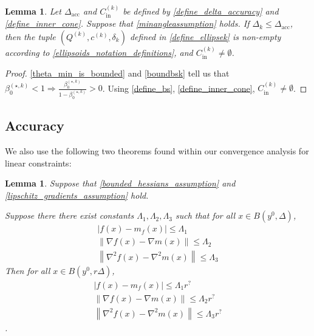\documentclass{article}
\newtheorem{lemma}[theorem]{Lemma}
\theoremstyle{case}
\numberwithin{theorem}{subsection}
\newcommand{\bsk}{{\beta_0^{(\star, k)}}}
\newcommand{\ck}{{c^{(k)}}}
\newcommand{\dacc}{{\Delta_{\textrm{acc}}}}
\newcommand{\dk}{\Delta_k}
\newcommand{\fcki}{{C^{(k)}_{\textrm{in}}}}
\newcommand{\gradf}{\nabla f}
\newcommand{\liphess}{{L_{\nabla^2}}}
\newcommand{\qk}{{Q^{(k)}}}
\newcommand{\sdk}{{\delta_k}}
\begin{document}
\begin{lemma}
\label{sampletrk_is_nonempty}
Let $\dacc$ and $\fcki$ be defined by \cref{define_delta_accuracy} and \cref{define_inner_cone}.
Suppose that \cref{minangleassumption} holds.
If $\dk \le \dacc$, then the tuple $(\qk, \ck, \sdk)$ defined in \cref{define_ellipsek}
is non-empty according to \cref{ellipsoids_notation_definitions}, and $\fcki \ne \emptyset$.
\end{lemma}
\begin{proof}
\cref{theta_min_is_bounded} and \cref{boundbsk} tell us that $\bsk < 1 \Longrightarrow \frac{\bsk}{1 - \bsk} > 0$.
Using \cref{define_bs}, \cref{define_inner_cone},
$\fcki \ne \emptyset$.
\end{proof}


\subsection{Accuracy}
\label{ellipsoidal_lambda}

We also use the following two theorems found within our convergence analysis for linear constraints:

\begin{lemma}
\label{change_radius} 
Suppose that \cref{bounded_hessians_assumption} and \cref{lipschitz_gradients_assumption} hold.

Suppose there there exist constants $\Lambda_1, \Lambda_2, \Lambda_3$ such that for all $x \in B\left(y^0, \Delta\right)$,
\begin{align*}
\left|f(x) - m_f(x)\right| \le \Lambda_1 \\ %
\left\|\gradf(x) - \nabla m(x)\right\| \le \Lambda_2 \\ %
\left\|\nabla^2 f(x) - \nabla^2 m(x)\right\| \le \Lambda_3 %
\end{align*}
Then for all $x \in B\left(y^0, r\Delta\right)$,
\begin{align*}
\left|f(x) - m_f(x)\right| \le \Lambda_1 r^? \\ %
\left\|\gradf(x) - \nabla m(x)\right\| \le \Lambda_2 r^?\\ %
\left\|\nabla^2 f(x) - \nabla^2 m(x)\right\| \le \Lambda_3 r^?%
\end{align*}.
\end{lemma}
\end{document}
